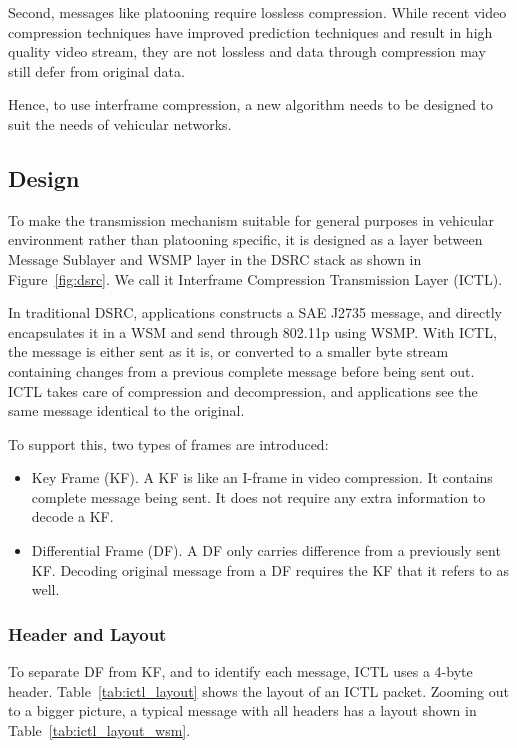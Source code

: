 \documentclass[12pt]{report}
\begin{document}
Second, messages like platooning require lossless compression. While recent video compression techniques have improved prediction techniques and result in high quality video stream, they are not lossless and data through compression may still defer from original data.

Hence, to use interframe compression, a new algorithm needs to be designed to suit the needs of vehicular networks.

\subsection{Design}

To make the transmission mechanism suitable for general purposes in vehicular environment rather than platooning specific, it is designed as a layer between Message Sublayer and WSMP layer in the DSRC stack as shown in Figure~\ref{fig:dsrc}. We call it Interframe Compression Transmission Layer (ICTL).

In traditional DSRC, applications constructs a SAE J2735 message, and directly encapsulates it in a WSM and send through 802.11p using WSMP. With ICTL, the message is either sent as it is, or converted to a smaller byte stream containing changes from a previous complete message before being sent out. ICTL takes care of compression and decompression, and applications see the same message identical to the original.

To support this, two types of frames are introduced:

\begin{itemize}
  \item Key Frame (KF). A KF is like an I-frame in video compression. It contains complete message being sent. It does not require any extra information to decode a KF.
  \item Differential Frame (DF). A DF only carries difference from a previously sent KF. Decoding original message from a DF requires the KF that it refers to as well.
\end{itemize}

\subsubsection{Header and Layout}

To separate DF from KF, and to identify each message, ICTL uses a 4-byte header. Table~\ref{tab:ictl_layout} shows the layout of an ICTL packet. Zooming out to a bigger picture, a typical message with all headers has a layout shown in Table~\ref{tab:ictl_layout_wsm}.
\end{document}
